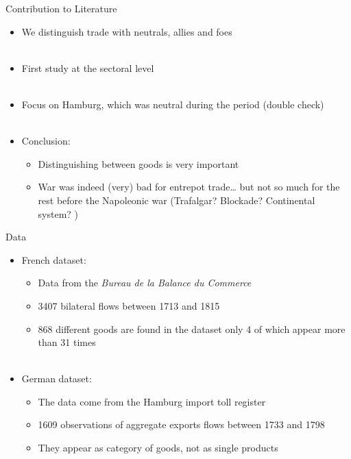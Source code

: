 \documentclass[11pt]{beamer}
\begin{document}
\begin{frame}{Contribution to Literature}
\begin{itemize}
\item{We distinguish trade with neutrals, allies and foes}\\~\\
\item{First study at the sectoral level}\\~\\
\item{Focus on Hamburg, which was neutral during the period (double check)}\\~\\
\item{Conclusion:}
\begin{itemize}
\item{Distinguishing between goods is very important}
\item{War was indeed (very) bad for entrepot trade… but not so much for the rest before the Napoleonic war (Trafalgar? Blockade? Continental system? )}
\end{itemize}
\end{itemize}
\end{frame}

\begin{frame}{Data}
\begin{itemize}
\item{French dataset:}
\begin{itemize}
\item{Data from the \textit{Bureau de la Balance du Commerce}}
\item{3407 bilateral flows between 1713 and 1815}
\item{868 different goods are found in the dataset only 4 of which appear more than 31 times}\\~\\
\end{itemize}
\item{German dataset:}
\begin{itemize}
\item{The data come from the Hamburg import toll register}
\item{1609 observations of aggregate exports flows between 1733 and 1798}
\item{They appear as category of goods, not as single products}
\end{itemize}
\end{itemize}
\end{frame}
\end{document}

